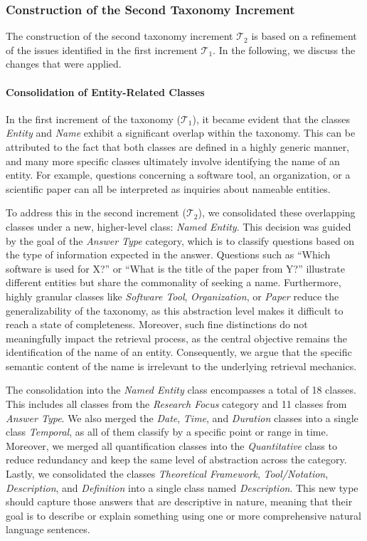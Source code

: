 \subsubsection{Construction of the Second Taxonomy Increment}
The construction of the second taxonomy increment $\mathcal{T}_2$ is based on a refinement of the issues identified in the first increment $\mathcal{T}_1$. In the following, we discuss the changes that were applied.

\paragraph{Consolidation of Entity-Related Classes}

In the first increment of the taxonomy ($\mathcal{T}_1$), it became evident that the classes \emph{Entity} and \emph{Name} exhibit a significant overlap within the taxonomy. This can be attributed to the fact that both classes are defined in a highly generic manner, and many more specific classes ultimately involve identifying the name of an entity. For example, questions concerning a software tool, an organization, or a scientific paper can all be interpreted as inquiries about nameable entities.

To address this in the second increment ($\mathcal{T}_2$), we consolidated these overlapping classes under a new, higher-level class: \emph{Named Entity}. This decision was guided by the goal of the \emph{Answer Type} category, which is to classify questions based on the type of information expected in the answer. Questions such as \enquote{Which software is used for X?} or \enquote{What is the title of the paper from Y?} illustrate different entities but share the commonality of seeking a name. Furthermore, highly granular classes like \emph{Software Tool}, \emph{Organization}, or \emph{Paper} reduce the generalizability of the taxonomy, as this abstraction level makes it difficult to reach a state of completeness. Moreover, such fine distinctions do not meaningfully impact the retrieval process, as the central objective remains the identification of the name of an entity. Consequently, we argue that the specific semantic content of the name is irrelevant to the underlying retrieval mechanics.

The consolidation into the \emph{Named Entity} class encompasses a total of 18 classes. This includes all classes from the \emph{Research Focus} category and 11 classes from \emph{Answer Type}. We also merged the \emph{Date}, \emph{Time}, and \emph{Duration} classes into a single class \emph{Temporal}, as all of them classify by a specific point or range in time. Moreover, we merged all quantification classes into the \emph{Quantitative} class to reduce redundancy and keep the same level of abstraction across the category. Lastly, we consolidated the classes \emph{Theoretical Framework}, \emph{Tool/Notation}, \emph{Description}, and \emph{Definition} into a single class named \emph{Description}. This new type should capture those answers that are descriptive in nature, meaning that their goal is to describe or explain something using one or more comprehensive natural language sentences. 

